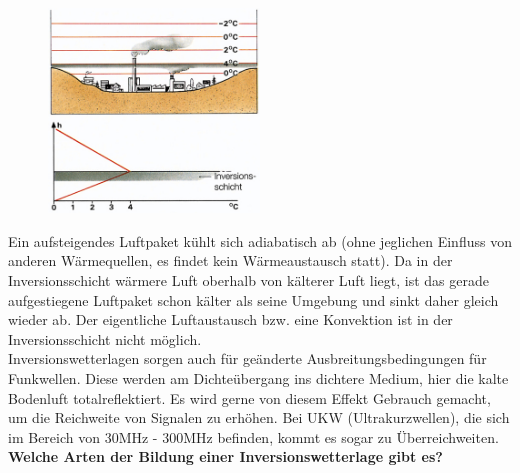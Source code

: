 \documentclass[11pt, a4paper]{article}
\begin{document}
\begin{figure}[h!]
	\centering
	\includegraphics[width=0.5\textwidth]{inversion}
\end{figure}
\newpage
Ein aufsteigendes Luftpaket kühlt sich adiabatisch ab (ohne jeglichen Einfluss von anderen Wärmequellen, es findet kein Wärmeaustausch statt). Da in der Inversionsschicht wärmere Luft oberhalb von kälterer Luft liegt, ist das gerade aufgestiegene Luftpaket schon kälter als seine Umgebung und sinkt daher gleich wieder ab. Der eigentliche Luftaustausch bzw. eine Konvektion ist in der Inversionsschicht nicht möglich. \\

Inversionswetterlagen sorgen auch für geänderte Ausbreitungsbedingungen für Funkwellen. Diese werden am Dichteübergang ins dichtere Medium, hier die kalte Bodenluft totalreflektiert. Es wird gerne von diesem Effekt Gebrauch gemacht, um die Reichweite von Signalen zu erhöhen. Bei UKW (Ultrakurzwellen), die sich im Bereich von 30MHz - 300MHz befinden, kommt es sogar zu Überreichweiten. \\

\textbf{Welche Arten der Bildung einer Inversionswetterlage gibt es?}






\newpage
\nocite{*}

{}
\end{document}
